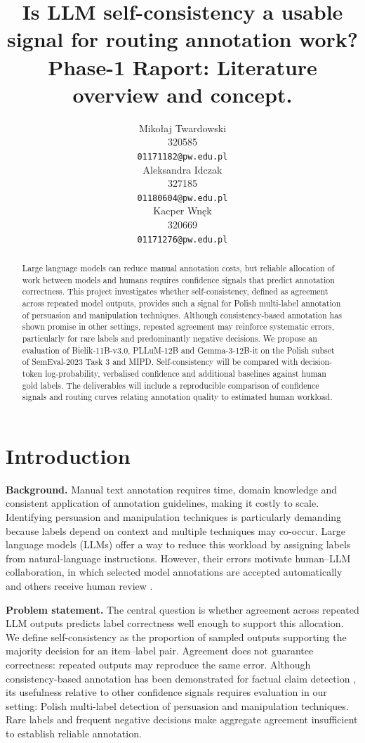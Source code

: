 \documentclass[11pt]{article}
\title{
Is LLM self-consistency a usable signal for routing annotation work?
Phase-1 Raport: Literature overview and concept.}
\author{Mikołaj Twardowski \\
  320585 \\
  {\tt 01171182@pw.edu.pl} \\
  \And
  Aleksandra Idczak \\
  327185 \\
  {\tt 01180604@pw.edu.pl} \\
  \And
  Kacper Wnęk \\
  320669 \\
  {\tt 01171276@pw.edu.pl} \\
  }
\date{}
\begin{document}
\maketitle


\begin{abstract}
Large language models can reduce manual annotation costs, but reliable allocation of work between models and humans requires confidence signals that predict annotation correctness. This project investigates whether self-consistency, defined as agreement across repeated model outputs, provides such a signal for Polish multi-label annotation of persuasion and manipulation techniques. Although consistency-based annotation has shown promise in other settings, repeated agreement may reinforce systematic errors, particularly for rare labels and predominantly negative decisions. We propose an evaluation of Bielik-11B-v3.0, PLLuM-12B and Gemma-3-12B-it on the Polish subset of SemEval-2023 Task 3 and MIPD. Self-consistency will be compared with decision-token log-probability, verbalised confidence and additional baselines against human gold labels.  The deliverables will include a reproducible comparison of confidence signals and routing curves relating annotation quality to estimated human workload. 
\end{abstract}

\section{Introduction}

\noindent\textbf{Background.}
Manual text annotation requires time, domain knowledge
and consistent application of annotation guidelines,
making it costly to scale. Identifying persuasion and
manipulation techniques is particularly demanding because
labels depend on context and multiple techniques may
co-occur. Large language models (LLMs) offer a way to
reduce this workload by assigning labels from natural-language
instructions. However, their errors motivate human--LLM
collaboration, in which selected model annotations are
accepted automatically and others receive human review
\cite{coannotating-uncertainty}.

\smallskip
\noindent\textbf{Problem statement.}
The central question is whether agreement across repeated
LLM outputs predicts label correctness well enough to
support this allocation. We define self-consistency as
the proportion of sampled outputs supporting the majority
decision for an item--label pair. Agreement does not
guarantee correctness: repeated outputs may reproduce
the same error. Although consistency-based annotation
has been demonstrated for factual claim detection
\cite{afacta-assist}, its usefulness relative to other
confidence signals requires evaluation in our setting:
Polish multi-label detection of persuasion and manipulation
techniques. Rare labels and frequent negative decisions
make aggregate agreement insufficient to establish
reliable annotation.
\end{document}
